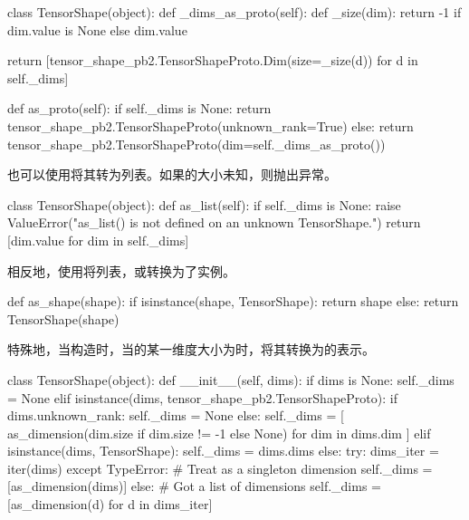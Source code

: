 \begin{content}
\begin{leftbar}
\begin{python} 
class TensorShape(object):
  def _dims_as_proto(self): 
    def _size(dim):
      return -1 if dim.value is None else dim.value
    
    return [tensor_shape_pb2.TensorShapeProto.Dim(size=_size(d))
            for d in self._dims]

  def as_proto(self):
    if self._dims is None:
      return tensor_shape_pb2.TensorShapeProto(unknown_rank=True)
    else:
      return tensor_shape_pb2.TensorShapeProto(dim=self._dims_as_proto())
\end{python}
\end{leftbar}

也可以使用将其转为列表。如果的大小未知，则抛出异常。

\begin{leftbar}
\begin{python} 
class TensorShape(object):
  def as_list(self):
    if self._dims is None:
      raise ValueError("as_list() is not defined on an unknown TensorShape.")
    return [dim.value for dim in self._dims]
\end{python}
\end{leftbar}

相反地，使用将列表，或转换为了实例。

\begin{leftbar}
\begin{python}
def as_shape(shape):
  if isinstance(shape, TensorShape):
    return shape
  else:
    return TensorShape(shape)
\end{python}
\end{leftbar}

特殊地，当构造时，当的某一维度大小为时，将其转换为的表示。

\begin{leftbar}
\begin{python}
class TensorShape(object):
  def __init__(self, dims):
    if dims is None:
      self._dims = None
    elif isinstance(dims, tensor_shape_pb2.TensorShapeProto):
      if dims.unknown_rank:
        self._dims = None
      else:
        self._dims = [
          as_dimension(dim.size if dim.size != -1 else None)
          for dim in dims.dim
        ]
    elif isinstance(dims, TensorShape):
      self._dims = dims.dims
    else:
      try:
        dims_iter = iter(dims)
      except TypeError:
        # Treat as a singleton dimension
        self._dims = [as_dimension(dims)]
      else:
        # Got a list of dimensions
        self._dims = [as_dimension(d) for d in dims_iter]
\end{python}
\end{leftbar}


\end{content}
